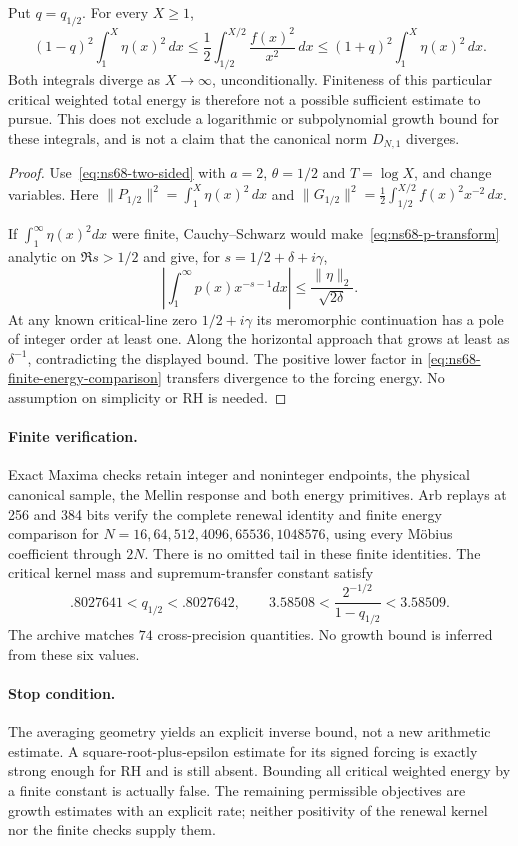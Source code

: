 \begin{corollary}
\label{cor:ns68-critical-energy}
Put $q=q_{1/2}$. For every $X\geq1$,
\begin{equation}
 (1-q)^2\int_1^X\eta(x)^2\,dx
 \leq\frac12\int_{1/2}^{X/2}\frac{f(x)^2}{x^2}\,dx
 \leq(1+q)^2\int_1^X\eta(x)^2\,dx.
 \label{eq:ns68-finite-energy-comparison}
\end{equation}
Both integrals diverge as $X\to\infty$, unconditionally. Finiteness
of this particular critical weighted total energy is therefore not a
possible sufficient estimate to pursue. This does not exclude a
logarithmic or subpolynomial growth bound for these integrals, and is
not a claim that the canonical norm $D_{N,1}$ diverges.
\end{corollary}
\begin{proof}
Use~\eqref{eq:ns68-two-sided} with $a=2$, $\theta=1/2$ and
$T=\log X$, and change variables. Here
$\|P_{1/2}\|^2=\int_1^X\eta(x)^2\,dx$ and
$\|G_{1/2}\|^2=\tfrac12\int_{1/2}^{X/2}f(x)^2x^{-2}\,dx$.

If $\int_1^\infty\eta(x)^2dx$ were finite, Cauchy--Schwarz would
make~\eqref{eq:ns68-p-transform} analytic on $\Re s>1/2$ and give,
for $s=1/2+\delta+i\gamma$,
\[
 \left|\int_1^\infty p(x)x^{-s-1}dx\right|
       \leq\frac{\|\eta\|_2}{\sqrt{2\delta}}.
\]
At any known critical-line zero $1/2+i\gamma$ its meromorphic
continuation has a pole of integer order at least one. Along the
horizontal approach that grows at least as $\delta^{-1}$, contradicting
the displayed bound. The positive lower factor in
\eqref{eq:ns68-finite-energy-comparison} transfers divergence to the
forcing energy. No assumption on simplicity or RH is needed.
\end{proof}

\paragraph{Finite verification.}
Exact Maxima checks retain integer and noninteger endpoints, the physical
canonical sample, the Mellin response and both energy primitives.
Arb replays at 256 and 384 bits verify the complete renewal identity
and finite energy comparison for
$N=16,64,512,4096,65536,1048576$, using every M\"obius coefficient
through $2N$. There is no omitted tail in these finite identities.
The critical kernel mass and supremum-transfer constant satisfy
\[
 .8027641<q_{1/2}<.8027642,\qquad
 3.58508<\frac{2^{-1/2}}{1-q_{1/2}}<3.58509.
\]
The archive matches $74$ cross-precision quantities. No growth bound
is inferred from these six values.

\paragraph{Stop condition.}
The averaging geometry yields an explicit inverse bound, not a new
arithmetic estimate. A square-root-plus-epsilon estimate for its signed
forcing is exactly strong enough for RH and is still absent. Bounding
all critical weighted energy by a finite constant is actually false.
The remaining permissible objectives are growth estimates with an
explicit rate; neither positivity of the renewal kernel nor the finite
checks supply them.
